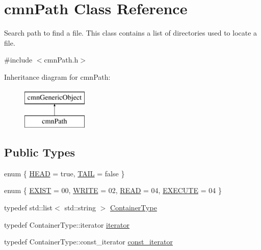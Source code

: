 \hypertarget{classcmn_path}{}\section{cmn\+Path Class Reference}
\label{classcmn_path}


Search path to find a file. This class contains a list of directories used to locate a file.  




{\ttfamily \#include $<$cmn\+Path.\+h$>$}

Inheritance diagram for cmn\+Path\+:\begin{figure}[H]
\begin{center}
\leavevmode
\includegraphics[height=2.000000cm]{da/d62/classcmn_path}
\end{center}
\end{figure}
\subsection*{Public Types}
\begin{DoxyCompactItemize}
\item 
enum \{ \hyperlink{group__cisst_common_ggac052729bcebb4fcdcef7eaaa81c21ab9a53c54bb785ea4ed82a051ce4508f152a}{H\+E\+A\+D} = true, 
\hyperlink{group__cisst_common_ggac052729bcebb4fcdcef7eaaa81c21ab9ae473342fccc1ae9e6812eb4e3c192352}{T\+A\+I\+L} = false
 \}
\item 
enum \{ \hyperlink{group__cisst_common_gga15dacf9562d80d5b7eb9b849726e768ca3f33be1cfafa854340d04aa7451978f8}{E\+X\+I\+S\+T} = 00, 
\hyperlink{group__cisst_common_gga15dacf9562d80d5b7eb9b849726e768caaacc5c06046553f65d493b0b02c1421c}{W\+R\+I\+T\+E} = 02, 
\hyperlink{group__cisst_common_gga15dacf9562d80d5b7eb9b849726e768caea0bb09a4a02da90f6c172531cd17a05}{R\+E\+A\+D} = 04, 
\hyperlink{group__cisst_common_gga15dacf9562d80d5b7eb9b849726e768cace4ec4b7133df9a67040ee7de03499fa}{E\+X\+E\+C\+U\+T\+E} = 04
 \}
\item 
typedef std\+::list$<$ std\+::string $>$ \hyperlink{classcmn_path_aa5870e72f7b99998f414021e28fe80a9}{Container\+Type}
\end{DoxyCompactItemize}
{\bf }\par
\begin{DoxyCompactItemize}
\item 
typedef Container\+Type\+::iterator \hyperlink{classcmn_path_a58a2a202a8ed8c65abb90be592724341}{iterator}
\item 
typedef Container\+Type\+::const\+\_\+iterator \hyperlink{classcmn_path_a9e313220d7a856280a1dff97d73c61f8}{const\+\_\+iterator}
\end{DoxyCompactItemize}

